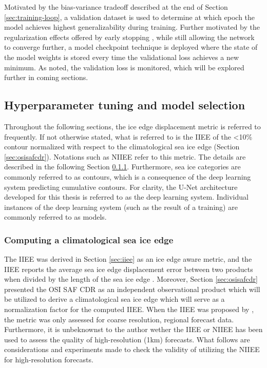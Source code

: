 \documentclass[../main/thesis]{subfiles}
\begin{document}
Motivated by the bias-variance tradeoff described at the end of Section \ref{sec:training-loop}, a validation dataset is used to determine at which epoch the model achieves highest generalizability during training. Further motivated by the regularization effects offered by early stopping \citep{Graves2013}, while still allowing the network to converge further, a model checkpoint technique is deployed where the state of the model weights is stored every time the validational loss achieves a new minimum. As noted, the validation loss is monitored, which will be explored further in coming sections.


\subsection{Hyperparameter tuning and model selection}
\label{sec:model_development_results}
Throughout the following sections, the ice edge displacement metric is referred to frequently. If not otherwise stated, what is referred to is the IIEE of the <10\% contour normalized with respect to the climatological sea ice edge (Section \ref{sec:osisafcdr}). Notations such as NIIEE refer to this metric. The details are described in the following Section \ref{sec:clim_iceedge_compute}. Furthermore, sea ice categories are commonly referred to as contours, which is a consequence of the deep learning system predicting cumulative contours. For clarity, the U-Net architecture developed for this thesis is referred to as the deep learning system. Individual instances of the deep learning system (such as the result of a training) are commonly referred to as models.

\subsubsection{Computing a climatological sea ice edge}
\label{sec:clim_iceedge_compute}
The IIEE \citep{Goessling2016} was derived in Section \ref{sec:iiee} as an ice edge aware metric, and the IIEE reports the average sea ice edge displacement error between two products when divided by the length of the sea ice edge \citep{Melsom2019}. Moreover, Section \ref{sec:osisafcdr} presented the OSI SAF CDR as an independent observational product which will be utilized to derive a climatological sea ice edge which will serve as a normalization factor for the computed IIEE. When the IIEE was proposed by \citet{Goessling2016}, the metric was only assessed for coarse resolution, regional forecast data. Furthermore, it is unbeknownst to the author wether the IIEE or NIIEE has been used to assess the quality of high-resolution (1km) forecasts. What follows are considerations and experiments made to check the validity of utilizing the NIIEE for high-resolution forecasts.
\end{document}
